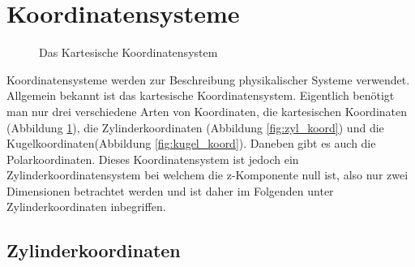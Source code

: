 \section{Koordinatensysteme}
\begin{figure}[h]
	\centering
	\caption[Kartesische Koordinaten]{Das Kartesische Koordinatensystem}
	\label{fig:kart_koord}
\end{figure}

Koordinatensysteme werden zur Beschreibung physikalischer Systeme verwendet. Allgemein bekannt ist das kartesische Koordinatensystem.
Eigentlich benötigt man nur drei verschiedene Arten von Koordinaten, die kartesischen Koordinaten (Abbildung \ref{fig:kart_koord}),  die Zylinderkoordinaten (Abbildung \ref{fig:zyl_koord}) und die Kugelkoordinaten(Abbildung \ref{fig:kugel_koord}). 
Daneben gibt es auch die Polarkoordinaten. Dieses Koordinatensystem ist jedoch ein Zylinderkoordinatensystem bei welchem die z-Komponente null ist, also nur zwei Dimensionen betrachtet werden und ist daher im Folgenden unter Zylinderkoordinaten inbegriffen. 

\subsection{Zylinderkoordinaten}



